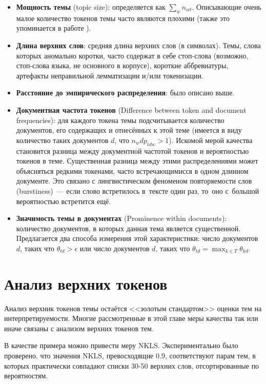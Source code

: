 \begin{itemize}
    \item \textbf{Мощность темы} (topic size): определяется как $\sum_w n_{wt}$. Описывающие очень малое количество токенов темы часто являются плохими (также это упоминается в работе \cite{mimno}).
    \item \textbf{Длина верхних слов}: средняя длина верхних слов (в символах). Темы, слова которых аномально коротки, часто содержат в себе стоп-слова (возможно, стоп-слова языка, не основного в корпусе), короткие аббревиатуры, артефакты неправильной лемматизации и/или токенизации.
    \item{\textbf{Расстояние до эмпирического распределения}: было описано выше.}
    \item{\textbf{Документная частота токенов} (Difference between token and document frequencies): для каждого токена темы подсчитывается количество документов, его содержащих и отнесённых к этой теме (имеется в виду количество таких документов $d$, что $n_wd p_{tdw} > 1$).
    Искомой мерой качества становится разница между документной частотой токенов и вероятностью токенов в теме. Существенная разница между этими распределениями может объясняться редкими токенами, часто встречающимисся в одном длинном документе. Это связано с лингвистическом феноменом повторяемости слов (burstiness)~--- если слово встретилось в~тексте один раз, то~оно с~большой вероятностью встретится ещё.}
    \item{\textbf{Значимость темы в документах} (Prominence within documents): количество документов, в которых данная тема является существенной. Предлагается два способа измерения этой характеристики: число документов $d$, таких что $\theta_{td} > \epsilon$ или число документов $d$, таких что $\theta_{td} = \max_{k \in T} \theta_{kd}$.}
\end{itemize}

\section{Анализ верхних токенов}
\label{sec:toptokens}

Анализ верхник токенов темы остаётся <<золотым стандартом>> оценки тем на интерпретируемости. Многие рассмотренные в этой главе меры качества так или иначе связаны с анализом верхних токенов тем.

В качестве примера можно привести меру NKLS. Экспериментально было проверено, что значения NKLS, превосходящие 0.9, соответствуют парам тем, в которых практически совпадают списки 30-50 верхних слов, отсортированные по вероятностям.


